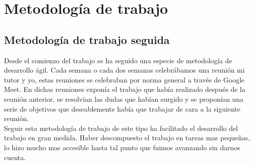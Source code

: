\cleardoublepage
\clearpage{}

\chapter[Metodología de trabajo]{Metodología de trabajo}
\section{Metodología de trabajo seguida}
Desde el comienzo del trabajo se ha seguido una especie de metodología de desarrollo ágil. Cada semana o cada dos semanas celebrábamos una reunión mi tutor y yo, estas reuniones se celebraban por norma general a través de Google Meet. En dichas reuniones exponía el trabajo que había realizado después de la reunión anterior, se resolvían las dudas que habían surgido y se proponían una serie de objetivos que deseablemente había que trabajar de cara a la siguiente reunión. \\

Seguir esta metodología de trabajo de este tipo ha facilitado el desarrollo del trabajo en gran medida. Haber descompuesto el trabajo en tareas mas pequeñas, lo hizo mucho mas accesible hasta tal punto que fuimos avanzando sin darnos cuenta. 